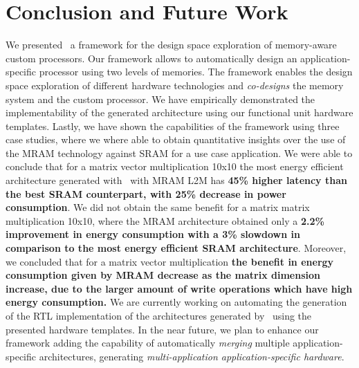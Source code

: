 \section{Conclusion and Future Work}
We presented \frameworkname~a framework for the design space exploration of  memory-aware custom processors. Our framework allows to automatically design an application-specific processor using two levels of memories. The framework enables the design space exploration of different hardware technologies and \textit{co-designs} the memory system and the custom processor. We have empirically demonstrated the implementability of the generated architecture using our functional unit hardware templates. Lastly, we have shown the capabilities of the framework using three case studies, where we where able to obtain quantitative insights over the use of the MRAM technology against SRAM for a use case application. We were able to conclude that for a matrix vector multiplication 10x10 the most energy efficient architecture generated with \frameworkname~with MRAM L2M has \textbf{45\% higher latency than the best SRAM counterpart, with 25\% decrease in power consumption}. We did not obtain the same benefit for a matrix matrix multiplication 10x10, where the MRAM architecture obtained only a \textbf{2.2\% improvement in energy consumption with a 3\% slowdown in comparison to the most energy efficient SRAM architecture}. Moreover, we concluded that for a matrix vector multiplication \textbf{the benefit in energy consumption given by MRAM decrease as the matrix dimension increase, due to the larger amount of write operations which have high energy consumption.}
We are currently working on automating the generation of the RTL implementation of the architectures generated by \frameworkname~using the presented hardware templates. In the near future, we plan to enhance our framework adding the capability of automatically \textit{merging} multiple application-specific architectures, generating \textit{multi-application application-specific hardware}.

